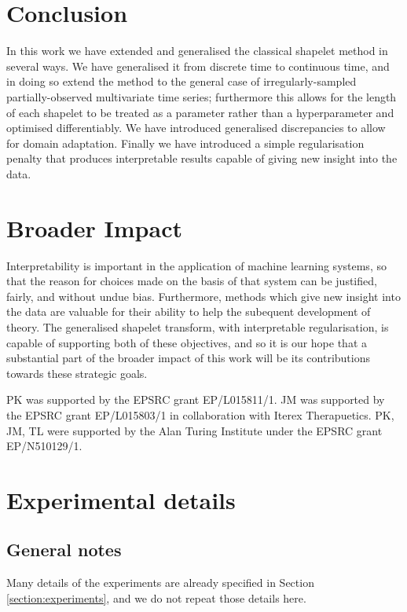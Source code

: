 \documentclass{article}
\theoremstyle{plain}
\theoremstyle{definition}
\begin{document}


	\section{Conclusion}
	In this work we have extended and generalised the classical shapelet method in several ways. We have generalised it from discrete time to continuous time, and in doing so extend the method to the general case of irregularly-sampled partially-observed multivariate time series; furthermore this allows for the length of each shapelet to be treated as a parameter rather than a hyperparameter and optimised differentiably. We have introduced generalised discrepancies to allow for domain adaptation. Finally we have introduced a simple regularisation penalty that produces interpretable results capable of giving new insight into the data.
	
	\section*{Broader Impact}
	Interpretability is important in the application of machine learning systems, so that the reason for choices made on the basis of that system can be justified, fairly, and without undue bias. Furthermore, methods which give new insight into the data are valuable for their ability to help the subequent development of theory. The generalised shapelet transform, with interpretable regularisation, is capable of supporting both of these objectives, and so it is our hope that a substantial part of the broader impact of this work will be its contributions towards these strategic goals.
	
	
	\begin{ack}
	PK was supported by the EPSRC grant EP/L015811/1. JM was supported by the EPSRC grant EP/L015803/1 in collaboration with Iterex Therapuetics. PK, JM, TL were supported by the Alan Turing Institute under the EPSRC grant EP/N510129/1.
	\end{ack}
	
	\small
	
	 
	
	\normalsize
	\newpage
	\appendix
	
	\section{Experimental details}\label{appendix:experimental}
	\subsection{General notes}
	Many details of the experiments are already specified in Section \ref{section:experiments}, and we do not repeat those details here.
	
\end{document}

